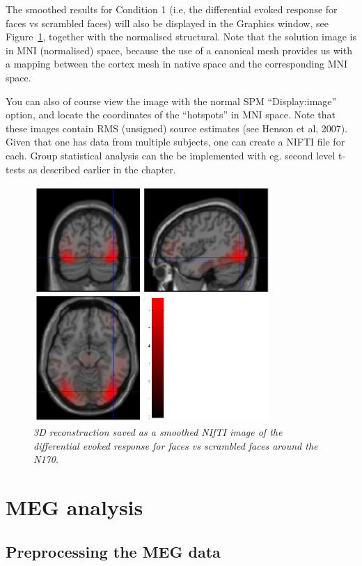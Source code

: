 The smoothed results for Condition 1 (i.e, the differential evoked response for faces vs scrambled faces) will also be displayed in the Graphics window, see Figure~\ref{multimodal:fig:eegrecon}, together with the normalised structural. Note that the solution image is in MNI (normalised) space, because the use of a canonical mesh provides us with a mapping between the cortex mesh in native space and the corresponding MNI space.

You can also of course view the image with the normal SPM ``Display:image'' option, and locate the coordinates of the ``hotspots'' in MNI space. Note that these images contain RMS (unsigned) source estimates (see Henson et al, 2007).
Given that one has data from multiple subjects, one can create a NIFTI file for each. Group statistical analysis can the be implemented with eg. second level t-tests as described earlier in the chapter.


\begin{figure}[h!t]
\begin{center}
\includegraphics[width=90mm]{multimodal/figures/eeg_recon.png}
\caption{\em 3D reconstruction saved as a smoothed NIfTI image of the differential evoked response for faces vs scrambled faces around the N170. \label{multimodal:fig:eegrecon}}
\end{center}
\end{figure}

\section{MEG analysis}

\subsection{Preprocessing the MEG data}

